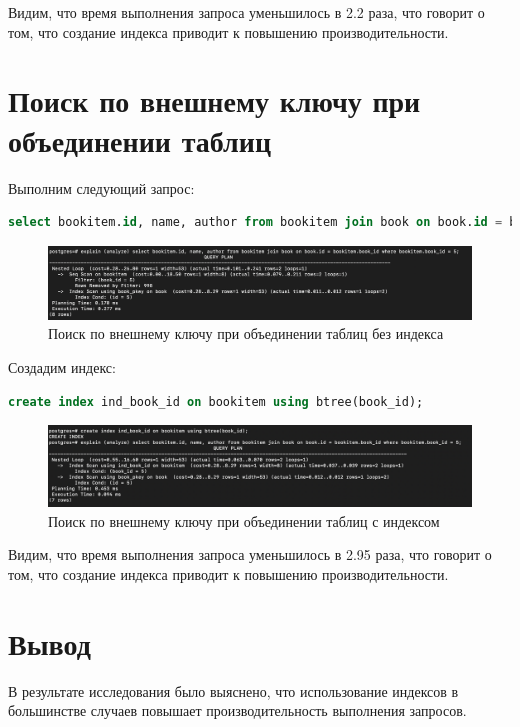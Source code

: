 Видим, что время выполнения запроса уменьшилось в 2.2 раза, что говорит о том, что создание индекса приводит к повышению производительности. 

\newpage
\section{Поиск по внешнему ключу при объединении таблиц}
Выполним следующий запрос:
\begin{lstlisting}[label=lst:fk, caption=Запрос поиска по внешнему ключу при объединении таблиц, language=sql]
select bookitem.id, name, author from bookitem join book on book.id = bookitem.book_id where bookitem.book_id = 5;
\end{lstlisting}

\begin{figure}[h!]
	\begin{center}
		\includegraphics[width = \linewidth]{img/fk.png}
	\end{center}
	\captionsetup{justification=centering}
	\caption{Поиск по внешнему ключу при объединении таблиц без индекса}
	\label{img:get-example}
\end{figure}

Создадим индекс:

\begin{lstlisting}[label=lst:fk_idx, caption=Создание индекса для поиска по внешнему ключу при объединении таблиц, language=sql]
create index ind_book_id on bookitem using btree(book_id);
\end{lstlisting}

\begin{figure}[h!]
	\begin{center}
		\includegraphics[width = \linewidth]{img/fk_idx.png}
	\end{center}
	\captionsetup{justification=centering}
	\caption{Поиск по внешнему ключу при объединении таблиц с индексом}
	\label{img:get-example}
\end{figure}

Видим, что время выполнения запроса уменьшилось в 2.95 раза, что говорит о том, что создание индекса приводит к повышению производительности. 

\section*{Вывод}
В результате исследования было выяснено, что использование индексов в большинстве случаев повышает производительность выполнения запросов. 